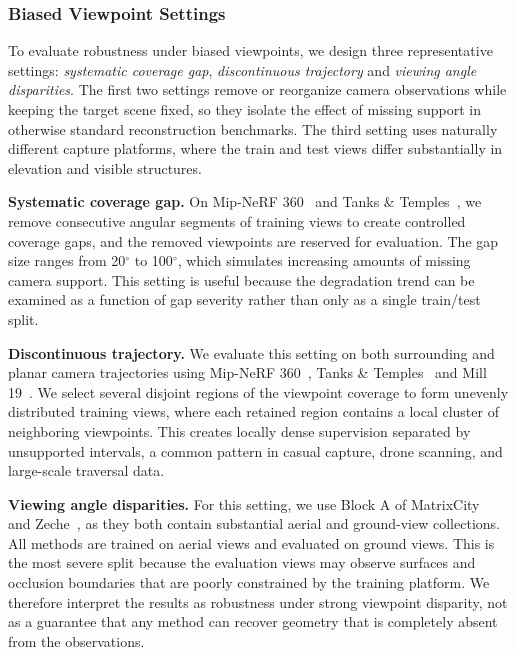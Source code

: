 \documentclass[lettersize,journal]{IEEEtran}
\begin{document}
\subsubsection{Biased Viewpoint Settings}

To evaluate robustness under biased viewpoints, we design three representative settings: \emph{systematic coverage gap}, \emph{discontinuous trajectory} and \emph{viewing angle disparities}. The first two settings remove or reorganize camera observations while keeping the target scene fixed, so they isolate the effect of missing support in otherwise standard reconstruction benchmarks. The third setting uses naturally different capture platforms, where the train and test views differ substantially in elevation and visible structures.

\textbf{Systematic coverage gap.}
On Mip-NeRF 360~\cite{mipnerf360} and Tanks \& Temples~\cite{tankstemples}, we remove consecutive angular segments of training views to create controlled coverage gaps, and the removed viewpoints are reserved for evaluation. The gap size ranges from 20$^\circ$ to 100$^\circ$, which simulates increasing amounts of missing camera support. This setting is useful because the degradation trend can be examined as a function of gap severity rather than only as a single train/test split.

\textbf{Discontinuous trajectory.}
We evaluate this setting on both surrounding and planar camera trajectories using Mip-NeRF 360~\cite{mipnerf360}, Tanks \& Temples~\cite{tankstemples} and Mill 19~\cite{meganerf}. We select several disjoint regions of the viewpoint coverage to form unevenly distributed training views, where each retained region contains a local cluster of neighboring viewpoints. This creates locally dense supervision separated by unsupported intervals, a common pattern in casual capture, drone scanning, and large-scale traversal data.

\textbf{Viewing angle disparities.}
For this setting, we use Block A of MatrixCity~\cite{matrixcity} and Zeche~\cite{isprs}, as they both contain substantial aerial and ground-view collections. All methods are trained on aerial views and evaluated on ground views. This is the most severe split because the evaluation views may observe surfaces and occlusion boundaries that are poorly constrained by the training platform. We therefore interpret the results as robustness under strong viewpoint disparity, not as a guarantee that any method can recover geometry that is completely absent from the observations.
\end{document}
